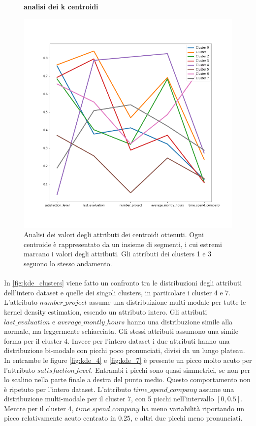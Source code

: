 \documentclass[10pt,a4paper,twocolumn]{article}
\begin{document}
\begin{figure}[hbtp]
\centering
\textbf{analisi dei k centroidi}\par
\includegraphics[width=1\columnwidth]{../images/k-centroids_analysis.png}
\caption{Analisi dei valori degli attributi dei centroidi ottenuti. Ogni centroide è rappresentato da un insieme di segmenti, i cui estremi marcano i valori degli attributi. Gli attributi dei clusters 1 e 3 seguono lo stesso andamento.}
\label{fig:centroids}
\end{figure}

\paragraph{}
In \autoref{fig:kde_clusters} viene fatto un confronto tra le distribuzioni degli attributi dell'intero dataset e quelle dei singoli clusters, in particolare i cluster 4 e 7. L'attributo $number\_project$ assume una distribuizione multi-modale per tutte le kernel density estimation, essendo un attributo intero. Gli attributi $last\_evaluation$ e $average\_montly\_hours$ hanno una distribuzione simile alla normale, ma leggermente schiacciata. Gli stessi attributi assumono una simile forma per il cluster 4. Invece per l'intero dataset i due attributi hanno una distribuzione bi-modale con picchi poco pronunciati, divisi da un lungo plateau. In entrambe le figure \ref{fig:kde_4} e \ref{fig:kde_7} è presente un picco molto acuto per l'attributo $satisfaction\_level$. Entrambi i picchi sono quasi simmetrici, se non per lo scalino nella parte finale a destra del punto medio. Questo comportamento non è ripetuto per l'intero dataset. L'attributo $time\_spend\_company$ assume una distribuzione multi-modale per il cluster 7, con 5 picchi nell'intervallo $\left[0, 0.5\right]$. 
Mentre per il cluster 4, 
$time\_spend\_company$ ha meno variabilità riportando un picco relativamente acuto centrato in $0.25$, e altri due picchi meno pronunciati.
\end{document}
